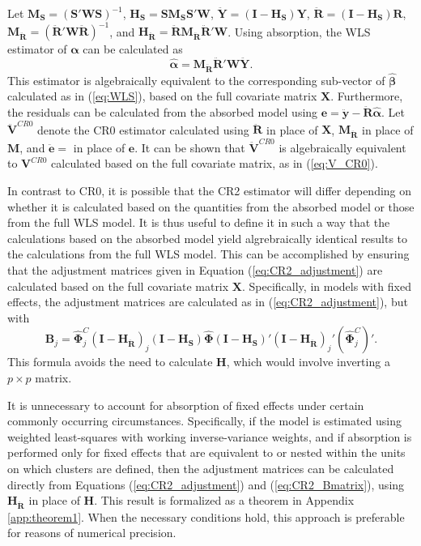 \documentclass[12pt]{article}\usepackage[]{graphicx}\usepackage[]{color}
\newcommand{\bm}{\mathbf}
\newcommand{\bs}{\boldsymbol}
\begin{document}
Let $\bm{M_S} = \left(\bm{S}'\bm{W}\bm{S}\right)^{-1}$, $\bm{H_S} = \bm{S} \bm{M_S} \bm{S}'\bm{W}$, $\bm{\ddot{Y}} = \left(\bm{I} - \bm{H_S}\right)\bm{Y}$, $\bm{\ddot{R}} = \left(\bm{I} - \bm{H_S}\right)\bm{R}$, $\bm{M_{\ddot{R}}} = \left(\bm{\ddot{R}}' \bm{W} \bm{\ddot{R}}\right)^{-1}$, and $\bm{H_{\ddot{R}}} = \bm{\ddot{R}}\bm{M_{\ddot{R}}} \bm{\ddot{R}}' \bm{W}$. 
Using absorption, the WLS estimator of $\bs\alpha$ can be calculated as \[
\bs{\hat\alpha} = \bm{M_{\ddot{R}}} \bm{\ddot{R}}' \bm{W} \bm{\ddot{Y}}. \]
This estimator is algebraically equivalent to the corresponding sub-vector of $\bs{\hat\beta}$  calculated as in (\ref{eq:WLS}), based on the full covariate matrix $\bm{X}$. 
Furthermore, the residuals can be calculated from the absorbed model using $\bm{e} = \bm{\ddot{y}} - \bm{\ddot{R}} \bs{\hat\alpha}$.
Let $\bm{\ddot{V}}^{CR0}$ denote the CR0 estimator calculated using $\bm{\ddot{R}}$ in place of $\bm{X}$, $\bm{M_{\ddot{R}}}$ in place of $\bm{M}$, and $\bm{\ddot{e}} = $ in place of $\bm{e}$. It can be shown that $\bm{\ddot{V}}^{CR0}$ is algebraically equivalent to $\bm{V}^{CR0}$ calculated based on the full covariate matrix, as in (\ref{eq:V_CR0}). 

In contrast to CR0, it is possible that the CR2 estimator will differ depending on whether it is calculated based on the quantities from the absorbed model or those from the full WLS model. 
It is thus useful to define it in such a way that the calculations based on the absorbed model yield algrebraically identical results to the calculations from the full WLS model. 
This can be accomplished by ensuring that the adjustment matrices given in Equation (\ref{eq:CR2_adjustment}) are calculated based on the full covariate matrix $\bm{X}$. Specifically, in models with fixed effects, the adjustment matrices are calculated as in (\ref{eq:CR2_adjustment}), but with 
\begin{equation}
\label{eq:CR2_panel_adjustment}
\bm{B}_j = \hat{\bs\Phi}_j^C\left(\bm{I} - \bm{H_{\ddot{R}}}\right)_j \left(\bm{I} - \bm{H_S}\right) \hat{\bs\Phi} \left(\bm{I} - \bm{H_S}\right)' \left(\bm{I} - \bm{H_{\ddot{R}}}\right)_j' \left(\hat{\bs\Phi}_j^C\right)'.
\end{equation}
This formula avoids the need to calculate $\bm{H}$, which would involve inverting a $p \times p$ matrix. 

It is unnecessary to account for absorption of fixed effects under certain commonly occurring circumstances. Specifically, if the model is estimated using weighted least-squares with working inverse-variance weights, and if absorption is performed only for fixed effects that are equivalent to or nested within the units on which clusters are defined, then the adjustment matrices can be calculated directly from Equations (\ref{eq:CR2_adjustment}) and (\ref{eq:CR2_Bmatrix}), using $\bm{H_{\ddot{R}}}$ in place of $\bm{H}$. This result is formalized as a theorem in Appendix \ref{app:theorem1}. When the necessary conditions hold, this approach is preferable for reasons of numerical precision.
\end{document}
